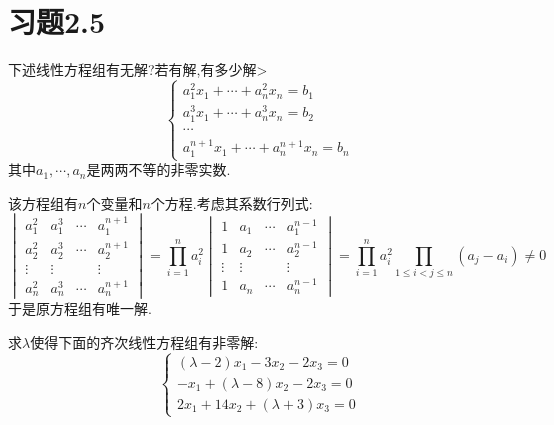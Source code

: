 \documentclass{ctexart}
\begin{document}
\section*{习题2.5}
\begin{homework}[2]
    下述线性方程组有无解?若有解,有多少解>
    \[\left\{\begin{array}{l}
        a_1^2x_1+\cdots+a_n^2x_n=b_1\\
        a_1^3x_1+\cdots+a_n^3x_n=b_2\\
        \cdots\\
        a_1^{n+1}x_1+\cdots+a_n^{n+1}x_n=b_n
    \end{array}\right.\]
    其中$a_1,\cdots,a_n$是两两不等的非零实数.
\end{homework}
\begin{solution}
    该方程组有$n$个变量和$n$个方程.考虑其系数行列式:
    \[\begin{vmatrix}
        a_1^2&a_1^3&\cdots&a_1^{n+1}\\
        a_2^2&a_2^3&\cdots&a_2^{n+1}\\
        \vdots&\vdots& &\vdots\\
        a_n^2&a_n^3&\cdots&a_n^{n+1}
    \end{vmatrix}=\prod_{i=1}^{n}a_i^2\begin{vmatrix}
        1&a_1&\cdots&a_1^{n-1}\\
        1&a_2&\cdots&a_2^{n-1}\\
        \vdots&\vdots& &\vdots\\
        1&a_n&\cdots&a_n^{n-1}
    \end{vmatrix}=\prod_{i=1}^{n}a_i^2\prod_{1\leqslant i<j\leqslant n}(a_j-a_i)\neq0\]
    于是原方程组有唯一解.
\end{solution}
\begin{homework}[3]
    求$\lambda$使得下面的齐次线性方程组有非零解:
    \[\left\{\begin{array}{l}
        (\lambda-2)x_1-3x_2-2x_3=0\\
        -x_1+(\lambda-8)x_2-2x_3=0\\
        2x_1+14x_2+(\lambda+3)x_3=0
    \end{array}\right.\]
\end{homework}
\end{document}
